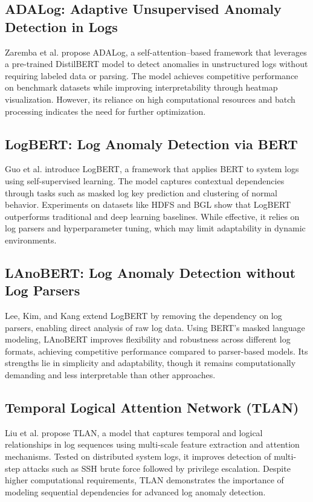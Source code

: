 \documentclass[12pt,a4paper]{report} %
\begin{document}
\subsection{ADALog: Adaptive Unsupervised Anomaly Detection in Logs}
Zaremba et al. \cite{Zaremba2025} propose ADALog, a self-attention–based framework that leverages a pre-trained DistilBERT model 
to detect anomalies in unstructured logs without requiring labeled data or parsing.  
The model achieves competitive performance on benchmark datasets while improving interpretability through heatmap visualization.  
However, its reliance on high computational resources and batch processing indicates the need for further optimization.  

\subsection{LogBERT: Log Anomaly Detection via BERT}
Guo et al. \cite{Guo2021} introduce LogBERT, a framework that applies BERT to system logs using self-supervised learning.  
The model captures contextual dependencies through tasks such as masked log key prediction and clustering of normal behavior.  
Experiments on datasets like HDFS and BGL show that LogBERT outperforms traditional and deep learning baselines.  
While effective, it relies on log parsers and hyperparameter tuning, which may limit adaptability in dynamic environments.  

\subsection{LAnoBERT: Log Anomaly Detection without Log Parsers}
Lee, Kim, and Kang \cite{Lee2021} extend LogBERT by removing the dependency on log parsers, enabling direct analysis of raw log data.  
Using BERT’s masked language modeling, LAnoBERT improves flexibility and robustness across different log formats, 
achieving competitive performance compared to parser-based models.  
Its strengths lie in simplicity and adaptability, though it remains computationally demanding and less interpretable 
than other approaches.  

\subsection{Temporal Logical Attention Network (TLAN)}
Liu et al. \cite{Liu2024} propose TLAN, a model that captures temporal and logical relationships in log sequences using multi-scale 
feature extraction and attention mechanisms.  
Tested on distributed system logs, it improves detection of multi-step attacks such as SSH brute force followed 
by privilege escalation.  
Despite higher computational requirements, TLAN demonstrates the importance of modeling sequential dependencies 
for advanced log anomaly detection.  
\end{document}
